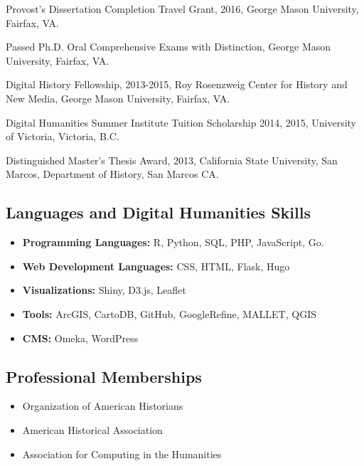 \documentclass[11pt]{article}
\begin{document}
Provost's Dissertation Completion Travel Grant, 2016, George Mason University, Fairfax, VA.

Passed Ph.D. Oral Comprehensive Exams with Distinction, George Mason University, Fairfax, VA.

Digital History Fellowship, 2013-2015, Roy Rosenzweig Center for History and New Media, George Mason University, Fairfax, VA.

Digital Humanities Summer Institute Tuition Scholarship 2014, 2015, University of Victoria, Victoria, B.C.

Distinguished Master's Thesis Award, 2013, California State University, San Marcos, Department of History, San Marcos CA.

\subsection{Languages and Digital Humanities Skills}
\begin{itemize}
  \itemsep0em 
  \item\textbf{Programming Languages:} R, Python, SQL, PHP, JavaScript, Go. 
  \item\textbf{Web Development Languages:} CSS, HTML, Flask, Hugo
  \item\textbf{Visualizations:} Shiny, D3.js, Leaflet
  \item\textbf{Tools:} ArcGIS, CartoDB, GitHub, GoogleRefine, MALLET, QGIS
  \item\textbf{CMS:} Omeka, WordPress
\end{itemize}

\subsection{Professional Memberships}
\begin{itemize}
  \itemsep0em 
  \item{Organization of American Historians}
  \item{American Historical Association}
  \item{Association for Computing in the Humanities}
\end{itemize}
\end{document}
